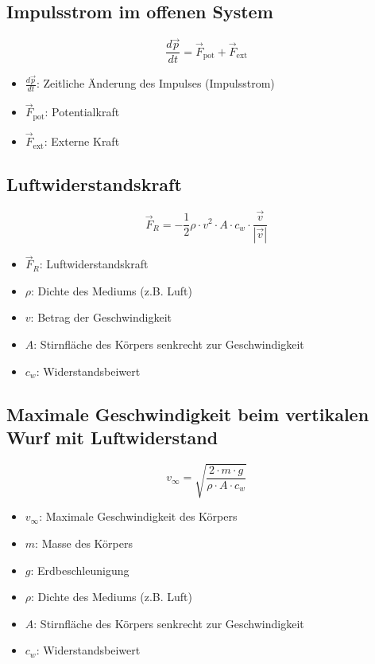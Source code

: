 \documentclass[a4paper, 8pt]{extarticle}
\begin{document}
\begin{landscape}
\begin{multicols*}{3}
\subsection{Impulsstrom im offenen System}
\[
\frac{d\vec{p}}{dt} = \vec{F}_{\text{pot}} + \vec{F}_{\text{ext}}
\]
{\footnotesize
\begin{itemize}
    \item \( \frac{d\vec{p}}{dt} \): Zeitliche Änderung des Impulses (Impulsstrom)
    \item \( \vec{F}_{\text{pot}} \): Potentialkraft
    \item \( \vec{F}_{\text{ext}} \): Externe Kraft
\end{itemize}
}

\subsection{Luftwiderstandskraft}
\[
\vec{F}_R = -\frac{1}{2} \rho \cdot v^2 \cdot A \cdot c_w \cdot \frac{\vec{v}}{|\vec{v}|}
\]
{\footnotesize
\begin{itemize}
    \item \( \vec{F}_R \): Luftwiderstandskraft
    \item \( \rho \): Dichte des Mediums (z.B. Luft)
    \item \( v \): Betrag der Geschwindigkeit
    \item \( A \): Stirnfläche des Körpers senkrecht zur Geschwindigkeit
    \item \( c_w \): Widerstandsbeiwert
\end{itemize}
}

\subsection{Maximale Geschwindigkeit beim vertikalen Wurf mit Luftwiderstand}
\[
v_{\infty} = \sqrt{\frac{2 \cdot m \cdot g}{\rho \cdot A \cdot c_w}}
\]
{\footnotesize
\begin{itemize}
    \item \( v_{\infty} \): Maximale Geschwindigkeit des Körpers
    \item \( m \): Masse des Körpers
    \item \( g \): Erdbeschleunigung
    \item \( \rho \): Dichte des Mediums (z.B. Luft)
    \item \( A \): Stirnfläche des Körpers senkrecht zur Geschwindigkeit
    \item \( c_w \): Widerstandsbeiwert
\end{itemize}
}

\end{multicols*}
\end{landscape}
\end{document}
